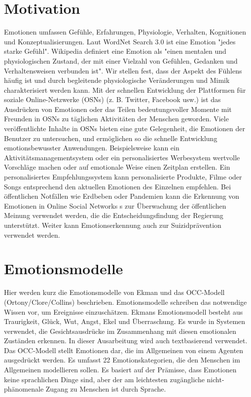 \documentclass[conference]{IEEEtran}
\begin{document}
\section{Motivation}
Emotionen umfassen Gefühle, Erfahrungen, Physiologie, Verhalten, Kognitionen und Konzeptualisierungen. Laut WordNet Search 3.0 ist eine Emotion "jedes starke Gefühl". Wikipedia definiert eine Emotion als "einen mentalen und physiologischen Zustand, der mit einer Vielzahl von Gefühlen, Gedanken und Verhaltensweisen verbunden ist". Wir stellen fest, dass der Aspekt des Fühlens häufig ist und durch begleitende physiologische Veränderungen und Mimik charakterisiert werden kann.\cite{b2}
Mit der schnellen Entwicklung der Plattformen für soziale Online-Netzwerke (OSNs) (z. B. Twitter, Facebook usw.) ist das Ausdrücken von Emotionen oder das Teilen bedeutungsvoller Momente mit Freunden in OSNs zu täglichen Aktivitäten der Menschen geworden.
Viele veröffentlichte Inhalte in OSNs bieten eine gute Gelegenheit, die Emotionen der Benutzer zu untersuchen, und ermöglichen so die schnelle Entwicklung emotionsbewusster Anwendungen.
Beispielsweise kann ein Aktivitätsmanagementsystem oder ein personalisiertes Werbesystem wertvolle Vorschläge machen oder auf emotionale Weise einen Zeitplan erstellen. Ein personalisiertes Empfehlungssystem kann personalisierte Produkte, Filme oder Songs entsprechend den aktuellen Emotionen des Einzelnen empfehlen. 
Bei öffentlichen Notfällen wie Erdbeben oder Pandemien kann die Erkennung von Emotionen in Online Social Networks s zur Überwachung der öffentlichen Meinung verwendet werden, die die Entscheidungsfindung der Regierung unterstützt.\cite{b1}
Weiter kann Emotionserkennung auch zur Suizidprävention verwendet werden.\cite{b6}



\section{Emotionsmodelle}
Hier werden kurz die Emotionsmodelle von Ekman und das OCC-Modell (Ortony/Clore/Collins) beschrieben. 
Emotionsmodelle schreiben das notwendige Wissen vor, um Ereignisse einzuschätzen. Ekmans Emotionsmodell besteht aus Traurigkeit, Glück, Wut, Angst, Ekel und Überraschung. Es wurde in Systemen verwendet, die Gesichtsausdrücke im Zusammenhang mit diesen emotionalen Zuständen erkennen. In dieser Ausarbeitung wird auch textbasierend verwendet. Das OCC-Modell stellt Emotionen dar, die im Allgemeinen von einem Agenten ausgedrückt werden. Es umfasst 22 Emotionskategorien, die den Menschen im Allgemeinen modellieren sollen. Es basiert auf der Prämisse, dass Emotionen keine sprachlichen Dinge sind, aber der am leichtesten zugängliche nicht-phänomenale Zugang zu Menschen ist durch Sprache.\cite{b2}
\end{document}
